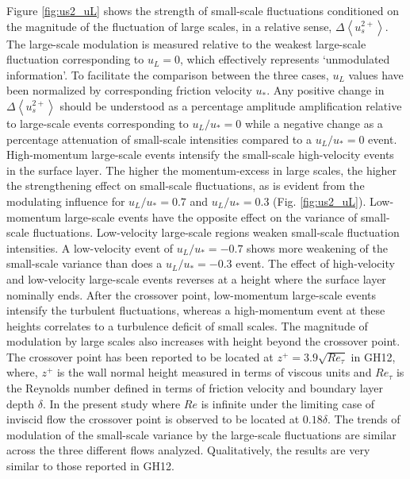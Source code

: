 Figure \ref{fig:us2_uL} shows the strength of small-scale fluctuations conditioned on the magnitude of the fluctuation of large scales, in a relative sense, $ \Delta \left < u_s^{2+}\right >$. The large-scale modulation is measured relative to the weakest large-scale fluctuation corresponding to $u_L=0$, which effectively represents `unmodulated information'. To facilitate the comparison between the three cases, $u_L$ values have been normalized by corresponding friction velocity $u_*$. Any positive change in $ \Delta \left < u_s^{2+}\right >$ should be understood as a percentage amplitude amplification relative to large-scale events corresponding to $u_L/u_*=0$ while a negative change as a percentage attenuation of small-scale intensities compared to a $u_L/u_*=0$ event.  High-momentum large-scale events intensify the small-scale high-velocity events in the surface layer. The higher the momentum-excess in large scales, the higher the strengthening effect on small-scale fluctuations, as is evident from the modulating influence for $u_L/u_*=0.7$ and $u_L/u_*=0.3$ (Fig. \ref{fig:us2_uL}).  Low-momentum large-scale events have the opposite effect on the variance of small-scale fluctuations. Low-velocity large-scale regions  weaken small-scale fluctuation intensities. A low-velocity event of $u_L/u_*=-0.7$ shows more weakening of the small-scale variance than does a $u_L/u_*=-0.3$ event. The effect of high-velocity and low-velocity large-scale events reverses at a height where the surface layer nominally ends. After the crossover point, low-momentum large-scale events intensify the turbulent fluctuations, whereas a high-momentum event at these heights correlates to a turbulence deficit of small scales. The magnitude of modulation by large scales also increases with height beyond the crossover point. The crossover point has been reported to be located at $z^{+}=3.9\sqrt{Re_{\tau}}$ in GH12, where, $z^{+}$ is the wall normal height measured in terms of viscous units and $Re_{\tau}$ is the Reynolds number defined in terms of friction velocity and boundary layer depth $\delta$. In the present study where $Re$ is infinite under the limiting case of inviscid flow the crossover point is observed to be located at $0.18\delta$. The trends of modulation of the small-scale variance by the large-scale fluctuations are similar across the three different flows analyzed. Qualitatively, the results are very similar to those reported in GH12.

